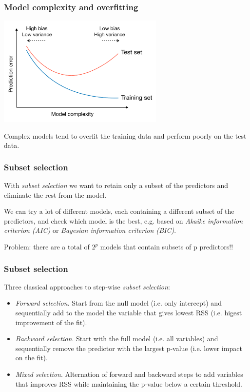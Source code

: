 \documentclass[notes]{beamer}          %
\begin{document}
\begin{frame}
\frametitle{Model complexity and overfitting}

\begin{center}
\includegraphics[height=5.5cm]{../figures/week_2_linear_models/Bias_variance_complexity.pdf}
\end{center}

Complex models tend to overfit the training data and perform poorly on the test data.

\end{frame}



\begin{frame}
\frametitle{Subset selection}

With \textit{subset selection} we want to retain only a subset of the predictors and eliminate the rest from the model.

\vspace{5mm} 

We can try a lot of different models, each containing a different subset of the predictors, and check which model is the best, e.g. based on \textit{Akaike information criterion (AIC)} or \textit{Bayesian information criterion (BIC)}.

\vspace{5mm} 

Problem: there are a total of $2^p$ models that contain subsets of p predictors!!

\end{frame}

\begin{frame}
\frametitle{Subset selection}

Three classical approaches to step-wise \textit{subset selection}:

\begin{itemize}
    \item \textit{Forward selection}. Start from the null model (i.e. only intercept) and sequentially add to the model the variable that gives lowest RSS (i.e. higest improvement of the fit).
    \item \textit{Backward selection}. Start with the full model (i.e. all variables) and sequentially remove the predictor with the largest p-value (i.e. lower impact on the fit).
    \item \textit{Mixed selection}. Alternation of forward and backward steps to add variables that improves RSS while maintaining the p-value below a certain threshold.
\end{itemize}

\end{frame}
\end{document}
